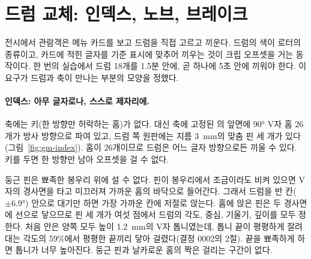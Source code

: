 \section{드럼 교체: 인덱스, 노브, 브레이크}\label{sec:gm-brake}

전시에서 관람객은 메뉴 카드를 보고 드럼을 직접 고르고 끼운다. 드럼의 색이 로터의 종류이고, 카드에 적힌 글자를 기준
표시에 맞추어 끼우는 것이 크립 오프셋을 거는 동작이다. 한 번의 실습에서 드럼 18개를 1.5분 안에, 곧 하나에 5초 안에
끼워야 한다. 이 요구가 드럼과 축이 만나는 부분의 모양을 정했다.

\paragraph{인덱스: 아무 글자로나, 스스로 제자리에.} 축에는 키(한 방향만 허락하는 홈)가 없다. 대신 축에 고정된
의 앞면에 90° V자 홈 26개가 방사 방향으로 파여 있고, 드럼 쪽 원판에는 지름 3~mm의
맞춤 핀 세 개가 있다(그림~\ref{fig:gm-index}). 홈이 26개이므로 드럼은 어느 글자 방향으로든 끼울 수 있다. 키를 두면
한 방향만 남아 오프셋을 걸 수 없다.

\Why 둥근 핀은 뾰족한 봉우리 위에 설 수 없다. 핀이 봉우리에서 조금이라도 비켜 있으면 V자의 경사면을 타고 미끄러져
가까운 홈의 바닥으로 들어간다. 그래서 드럼을 반 칸($\pm6.9°$) 안으로 대기만 하면 가장 가까운 칸에 저절로 앉는다.
홈에 앉은 핀은 두 경사면에 선으로 닿으므로 핀 세 개가 여섯 점에서 드럼의 각도, 중심, 기울기, 깊이를 모두 정한다.
처음 안은 양쪽 모두 높이 1.2~mm의 V자 톱니였는데, 톱니 끝이 평평하게 잘려 대는 각도의 59\%에서 평평한 끝끼리 닿아
걸렸다(결정 0002의 2절). 끝을 뾰족하게 하면 톱니가 너무 높아진다. 둥근 핀과 날카로운 홈의 짝은 걸리는 구간이 없다.

